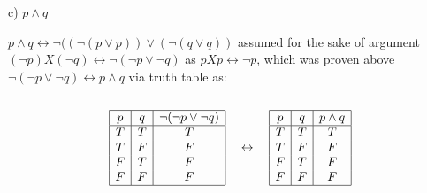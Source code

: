 \documentclass[12pt]{article}
\begin{document}
\begin{enumerate}
\vskip1cm

c) $p\land q$\\

{\color{blue}
$p\land q \leftrightarrow \neg((\neg(p\lor p))\lor(\neg(q\lor q))$ assumed for the sake of argument \\
$(\neg p) X (\neg q) \leftrightarrow \neg (\neg p \lor \neg q) $ as $pXp \leftrightarrow \neg p$, which was proven above \\
$\neg(\neg p \lor \neg q) \leftrightarrow p\land q $ via truth table as:\\\\

\[
\begin{array}{|c|c|c|}
\hline
p & q & \neg(\neg p \lor \neg q) \\
\hline
T & T & T \\
T & F & F \\
F & T & F \\
F & F & F \\
\hline
\end{array}
\quad \leftrightarrow \quad
\begin{array}{|c|c|c|}
\hline
p & q & p \land q \\
\hline
T & T & T \\
T & F & F \\
F & T & F \\
F & F & F \\
\hline
\end{array}
\]

}



\end{enumerate} 
\end{document}

